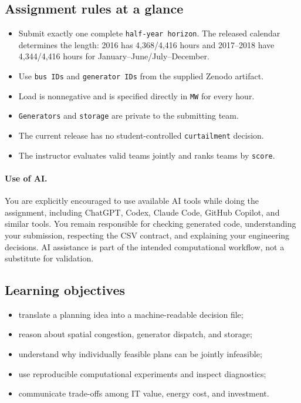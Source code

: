 \documentclass[12pt]{article}
\newcommand{\code}[1]{\texttt{#1}}
\begin{document}
\subsection{Assignment rules at a glance}
\begin{itemize}[leftmargin=*]
  \item Submit exactly one complete \code{half-year horizon}. The released calendar determines
  the length: 2016 has 4,368/4,416 hours and 2017--2018 have 4,344/4,416 hours
  for January--June/July--December.
  \item Use \code{bus IDs} and \code{generator IDs} from the supplied Zenodo artifact.
  \item Load is nonnegative and is specified directly in \code{MW} for every hour.
  \item \code{Generators} and \code{storage} are private to the submitting team.
  \item The current release has no student-controlled \code{curtailment} decision.
  \item The instructor evaluates valid teams jointly and ranks teams by \code{score}.
\end{itemize}

\paragraph{Use of AI.} You are explicitly encouraged to use available AI tools while doing the
assignment, including ChatGPT, Codex, Claude Code, GitHub Copilot, and similar
tools. You remain responsible for checking generated code, understanding your
submission, respecting the CSV contract, and explaining your engineering
decisions. AI assistance is part of the intended computational workflow, not a
substitute for validation.

\subsection{Learning objectives}
\begin{itemize}[leftmargin=*]
  \item translate a planning idea into a machine-readable decision file;
  \item reason about spatial congestion, generator dispatch, and storage;
  \item understand why individually feasible plans can be jointly infeasible;
  \item use reproducible computational experiments and inspect diagnostics;
  \item communicate trade-offs among IT value, energy cost, and investment.
\end{itemize}
\end{document}
